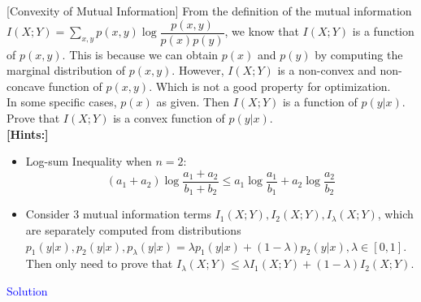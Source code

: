 \item {} [Convexity of Mutual Information] From the definition of the mutual information $I(X;Y)=\sum\limits_{x,y}p(x,y)\log\dfrac{p(x,y)}{p(x)p(y)}$, we know that $I(X;Y)$ is a function of $p(x,y)$. This is because we can obtain $p(x)$ and $p(y)$ by computing the marginal distribution of $p(x,y)$. However, $I(X;Y)$ is a non-convex and non-concave function of $p(x,y)$. Which is not a good property for optimization. \\
In some specific cases, $p(x)$ as given. Then $I(X;Y)$ is a function of $p(y|x)$. Prove that $I(X;Y)$ is a convex function of $p(y|x)$. \\
\textbf{[Hints:]}
\begin{itemize}
\item Log-sum Inequality when $n=2$:
$$(a_1+a_2)\log\dfrac{a_1+a_2}{b_1+b_2}\leq a_1\log\dfrac{a_1}{b_1}+a_2\log\dfrac{a_2}{b_2}$$
\item Consider $3$ mutual information terms $I_1(X;Y), I_2(X;Y), I_{\lambda}(X;Y)$, which are separately computed from distributions $p_1(y|x), p_2(y|x), p_{\lambda}(y|x)=\lambda p_1(y|x)+(1-\lambda)p_2(y|x), \lambda\in[0,1]$. Then only need to prove that $I_{\lambda}(X;Y)\leq \lambda I_1(X;Y)+(1-\lambda)I_2(X;Y)$.
\end{itemize}

\textcolor{blue}{Solution} \\






\newpage